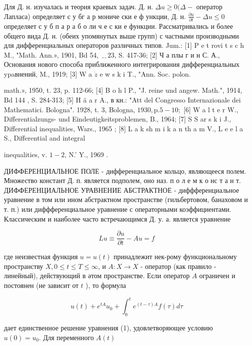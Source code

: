 \documentclass[10pt]{article}
\begin{document}
Для Д. н. изучалась и теория краевых задач. Д. н. $\Delta u \geqslant 0(\Delta-$ оператор Лапласа) определяет с у бг а р мониче ски е ф ункции, Д. н. $\frac{\partial u}{\partial t}-\Delta u \leqslant 0$ определяет с у б п а р а б о ли ч е с ки е функции. Рассматривались и более общего вида Д. н. (обеих упомянутых выше групп) с частными производными для дифференциальных операторов различных типов. Jum.: [1] P e t rovi t s c h M., "Math. Ann.», 1901, Bd 54, $﹎{2} 3$, S. 417-36; [2] Ч а плы г и н С. А., Основания нового способа приближенного интегрирования дифференциальных ypaвнений, M., 1919; [3] W a $\dot{z}$ e w s k i T., "Ann. Soc. polon.

math.», 1950, t. 23, p. 112-66; [4] B o h l P., "J. reine und angew. Math.", 1914, Bd 144 , S. 284-313; [5] H ä a r A., в кн.: "Att del Congresso Internazionale dei Mathematici. Bologna". 1928, t. 3, Bologna, $1930, \mathrm{p} .5-10 ;$ [6] W a l t e r W., Differentialzungs- und Eindeutigkeitsproblemen, B., 1964; [7] S $\mathrm{S}$ ar s k i J., Differential inequalities, Wars., 1965 ; [8] L a k sh m i k a n th a m V., L e e l a S., Differential and integral

inequalities, v. $1-2$, N.' Y., 1969 .



ДИФФЕРЕНЦИАЛЬНОЕ ПОЛЕ - дифференциальное кольцо, являющееся полем. Множество констант Д. п. является подполем, оно наз. п о л е м к о нс т а н т. ДИФФЕРЕНЦИАЛЬНОЕ УРАВНЕНИЕ АБСТРАКТНОЕ - диффференциальное уравнение в том или ином абстрактном пространстве (гильбертовом, банаховом и т. п.) или диффференциальное уравнение с операторными коэффициентами. Классическим и наиболее часто встречающимся Д. у. а. является уравнение



\[

L u \equiv \frac{\partial u}{\partial t}-A u=f

\]



где неизвестная функция $u=u(t)$ принадлежит нек-рому функциональному пространству $X, 0 \leqslant t \leqslant T \leqslant \infty$, и $A: X \rightarrow X$ - оператор (как правило - линейный), действующий в әтом пространстве. Если оператор $A$ ограничен и постоянен (не зависит от $t$ ), то формула



\[

u(t)+e^{t A} u_{0}+\int_{0}^{t} e^{(t-\tau) A} f(\tau) d \tau

\]



дает единственное решение уравнения (1), удовлетворяющее условию $u(0)=u_{0}$. Для переменного $A(t)$
\end{document}
